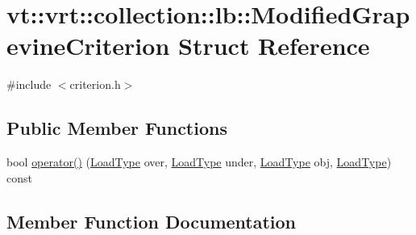 \hypertarget{structvt_1_1vrt_1_1collection_1_1lb_1_1_modified_grapevine_criterion}{}\section{vt\+:\+:vrt\+:\+:collection\+:\+:lb\+:\+:Modified\+Grapevine\+Criterion Struct Reference}
\label{structvt_1_1vrt_1_1collection_1_1lb_1_1_modified_grapevine_criterion}


{\ttfamily \#include $<$criterion.\+h$>$}

\subsection*{Public Member Functions}
\begin{DoxyCompactItemize}
\item 
bool \hyperlink{structvt_1_1vrt_1_1collection_1_1lb_1_1_modified_grapevine_criterion_a6331ccac176ead3e10e58809f3e02ef8}{operator()} (\hyperlink{namespacevt_a8fb51741340b87d7aaee0bef60e9896b}{Load\+Type} over, \hyperlink{namespacevt_a8fb51741340b87d7aaee0bef60e9896b}{Load\+Type} under, \hyperlink{namespacevt_a8fb51741340b87d7aaee0bef60e9896b}{Load\+Type} obj, \hyperlink{namespacevt_a8fb51741340b87d7aaee0bef60e9896b}{Load\+Type}) const
\end{DoxyCompactItemize}


\subsection{Member Function Documentation}
\mbox{\label{structvt_1_1vrt_1_1collection_1_1lb_1_1_modified_grapevine_criterion_a6331ccac176ead3e10e58809f3e02ef8}} 

